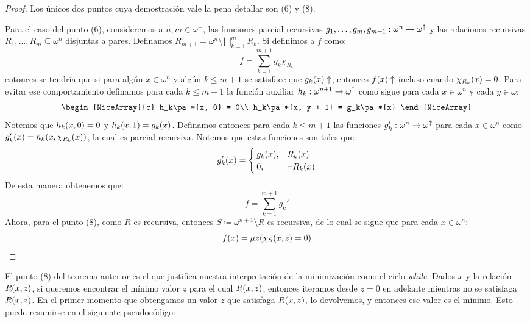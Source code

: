 \begin{proof}
	Los únicos dos puntos cuya demostración vale la pena detallar son (6) y (8).

	Para el caso del punto (6), consideremos a $n, m\in\omega^{+}$, las funciones parcial-recursivas $g_{1},\dotsc, g_{m}, g_{m + 1}:\omega^{n}\to\omega^{\uparrow}$ y las relaciones recursivas $R_{1},\dotsc, R_{m}\subseteq\omega^{n}$ disjuntas a pares. Definamos $R_{m + 1} =\omega^{n}\setminus\bigsqcup_{k = 1}^{m}R_{k}$.
	Si definimos a $f$ como:
	\[
		f =\sum_{k = 1}^{m + 1}g_{k}\chi_{R_{k}}
	\]
	entonces se tendría que si para algún $x\in\omega^n$ y algún $k\leq m + 1$ se satisface que $g_k\pa*{x}\DIVERGE$, entonces $f\pa*{x}\DIVERGE$ incluso cuando $\chi_{R_k}\pa*{x} = 0$. Para evitar ese comportamiento definamos para cada $k\leq m + 1$ la función auxiliar $h_k:\omega^{n + 1}\to\omega^\uparrow$ como sigue para cada $x\in\omega^n$ y cada $y\in\omega$:
	\[
		\begin{NiceArray}{c}
			h_k\pa*{x, 0} = 0\\
			h_k\pa*{x, y + 1} = g_k\pa*{x}
		\end{NiceArray}
	\]
	Notemos que $h_k\pa*{x, 0} = 0$ y $h_k\pa*{x, 1} = g_k\pa*{x}$. Definamos entonces para cada $k\leq m + 1$ las funciones $g_k':\omega^n\to\omega^\uparrow$ para cada $x\in\omega^n$ como $g_k'\pa*{x} = h_k\pa*{x,\chi_{R_k}\pa*{x}}$, la cual es parcial-recursiva. Notemos que estas funciones son tales que:
	\[
		g_k'\pa*{x} =
		\begin{cases}
			g_k\pa*{x},& R_k\pa*{x}\\
			0, &\lnot R_k\pa*{x}
		\end{cases}
	\]
	De esta manera obtenemos que:
	\[
		f =\sum_{k = 1}^{m + 1}g_{k}'
	\]
	Ahora, para el punto (8), como $R$ es recursiva, entonces $S\coloneqq\omega^{n + 1}\setminus R$ es recursiva, de lo cual se sigue que para cada $x\in\omega^n$:
	\[
		f\pa*{x} =\mu z\pa*{\CARACTERISTICA{S}\pa*{x, z} = 0}
	\]

\end{proof}

El punto (8) del teorema anterior es el que justifica nuestra interpretación de la minimización como el ciclo \emph{while}. Dados $x$ y la relación $R\pa*{x, z}$, si queremos encontrar el mínimo valor $z$ para el cual $R\pa*{x, z}$, entonces iteramos desde $z = 0$ en adelante mientras no se satisfaga $R\pa*{x, z}$. En el primer momento que obtengamos un valor $z$ que satisfaga $R\pa*{x, z}$, lo devolvemos, y entonces ese valor es el mínimo. Esto puede resumirse en el siguiente pseudocódigo:

